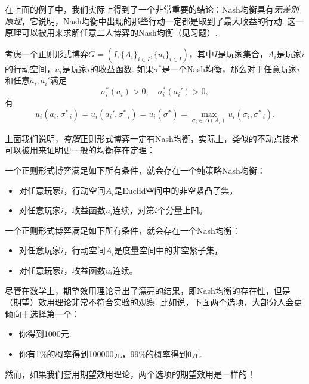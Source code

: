 在上面的例子中，我们实际上得到了一个非常重要的结论：Nash均衡具有\emph{无差别原理}，它说明，Nash均衡中出现的那些行动一定都是取到了最大收益的行动. 这一原理可以被用来求解任意二人博弈的Nash均衡（见习题）.

\begin{theorem}[无差别原理]
考虑一个正则形式博弈$G=(I,\{A_i\}_{i\in I},\{u_i\}_{i\in I})$，其中$I$是玩家集合，$A_i$是玩家$i$的行动空间，$u_i$是玩家$i$的收益函数. 如果$\sigma^*$是一个Nash均衡，那么对于任意玩家$i$和任意$a_i,a_i'$满足
\[\sigma^*_i(a_i)>0,\quad \sigma^*_i(a_i')>0,\]
有
\[u_i(a_i,\sigma^*_{-i})=u_i(a_i',\sigma^*_{-i})=u_i(\sigma^*)=\max_{\sigma_i\in\Delta(A_i)}u_i(\sigma_i,\sigma^*_{-i}).\]
\end{theorem}

上面我们说明，\emph{有限}正则形式博弈一定有Nash均衡，实际上，类似的不动点技术可以被用来证明更一般的均衡存在定理：

\begin{theorem}
    一个正则形式博弈满足如下所有条件，就会存在一个纯策略Nash均衡： 
    \begin{itemize}
        \item 对任意玩家$i$，行动空间$A_i$是Euclid空间中的非空紧凸子集，
        \item 对任意玩家$i$，收益函数$u_i$连续，对第$i$个分量上凹。
    \end{itemize}
\end{theorem}

\begin{theorem}[Glicksberg定理]
    一个正则形式博弈满足如下所有条件，就会存在一个Nash均衡：
    \begin{itemize}
        \item 对任意玩家$i$，行动空间$A_i$是度量空间中的非空紧子集，
        \item 对任意玩家$i$，收益函数$u_i$连续。
    \end{itemize}
\end{theorem}

尽管在数学上，期望效用理论导出了漂亮的结果，即Nash均衡的存在性，但是（期望）效用理论非常不符合实验的观察. 比如说，下面两个选项，大部分人会更倾向于选择第一个：
\begin{itemize}
    \item 你得到1000元.
    \item 你有1\%的概率得到100000元，99\%的概率得到0元.
\end{itemize}
然而，如果我们套用期望效用理论，两个选项的期望效用是一样的！

